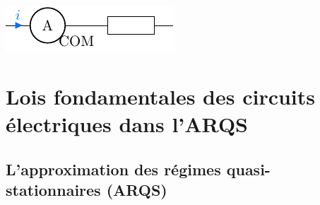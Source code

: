\documentclass[../../main/main.tex]{subfiles}
\begin{document}
\begin{tcb}[label=prop:mesure, sidebyside, righthand ratio=.4]
\begin{center}
{		}{
			\includegraphics[width=\linewidth]{amperemetre}
		}
	\end{center}
\end{tcb}

\section{Lois fondamentales des circuits électriques dans l'ARQS}

\subsection{L'approximation des régimes quasi-stationnaires (ARQS)}
\end{document}
